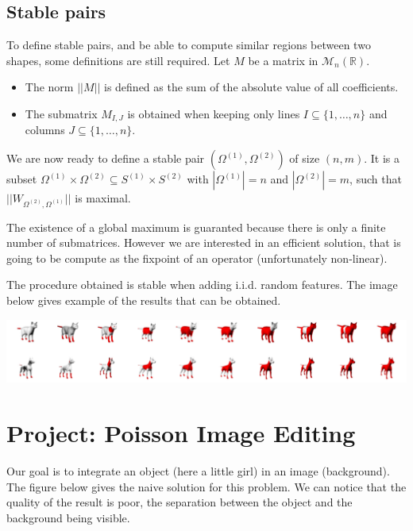 \documentclass[a4paper]{article}
\begin{document}
  \subsection{Stable pairs}

  To define stable pairs, and be able to compute similar regions between two shapes, some definitions are still required. Let $M$ be a matrix in $\mathcal M_n(\mathbb R)$.
  \begin{itemize}
    \item The norm $||M||$ is defined as the sum of the absolute value of all coefficients.
    \item The submatrix $M_{I,J}$ is obtained when keeping only lines $I \subseteq \{1, \dots, n\}$ and columns $J \subseteq \{1, \dots, n\}$.
  \end{itemize}
  
  We are now ready to define a stable pair $(\Omega^{(1)}, \Omega^{(2)})$ of size $(n,m)$. It is a subset $\Omega^{(1)} \times \Omega^{(2)} \subseteq S^{(1)} \times S^{(2)}$ with $|\Omega^{(1)}| = n$ and $|\Omega^{(2)}| = m$, such that $||W_{\Omega^{(2)}, \Omega^{(1)}}||$ is maximal.
  
  \medskip The existence of a global maximum is guaranted because there is only a finite number of submatrices. However we are interested in an efficient solution, that is going to be compute as the fixpoint of an operator (unfortunately non-linear).
  
  \medskip The procedure obtained is stable when adding i.i.d. random features. The image below gives example of the results that can be obtained.
  
  \bigskip \includegraphics[width=\textwidth]{article/result.png}
  
  \newpage
  
  \section{Project: Poisson Image Editing}
  
  Our goal is to integrate an object (here a little girl) in an image (background). The figure below gives the naive solution for this problem. We can notice that the quality of the result is poor, the separation between the object and the background being visible.
\end{document}
